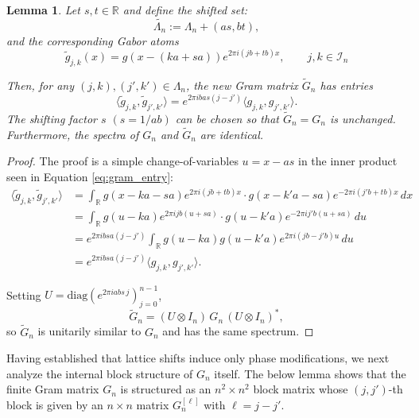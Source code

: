 \documentclass{article}
\newtheorem{lemma}[theorem]{Lemma}
\begin{document}
\begin{lemma} \label{lem:shift-invariance}
Let $s, t \in \mathbb{R}$ and define the shifted set:
\[
\widetilde{\Lambda_n} := \Lambda_n+(as, bt),
\]
and the corresponding Gabor atoms
\begin{equation}
\tilde{g}_{j,k}(x) = g(x - (ka+sa))e^{2\pi i (jb+tb) x}, \qquad j,k\in \mathcal{I}_n
\end{equation}

Then, for any $(j,k), (j',k') \in \Lambda_n$, the new Gram matrix $\tilde{G}_n$ has entries
\[
\langle \tilde{g}_{j,k}, \tilde{g}_{j',k'}\rangle = e^{2\pi i b as (j - j')} \langle g_{j,k}, g_{j',k'} \rangle.
\]
The shifting factor $s$ $(s=1/ab)$ can be chosen so that $\tilde{G}_n=G_n$ is unchanged. Furthermore, the spectra of $G_n$ and $\tilde{G}_n$ are identical.
\end{lemma}

\begin{proof}
The proof is a simple change-of-variables $u=x-as$ in the inner product seen in Equation \ref{eq:gram_entry}:
\begin{align*}
\langle \tilde{g}_{j,k}, \tilde{g}_{j',k'} \rangle
&= \int_{\mathbb{R}} g(x - ka - sa) e^{2\pi i (jb + tb)x} \cdot g(x - {k'}a - sa) e^{-2\pi i ({j'}b + tb)x} \, dx \\
&= \int_{\mathbb{R}} g(u - ka) e^{2\pi i jb (u + sa)} \cdot g(u - {k'}a) e^{-2\pi i {j'}b (u + sa)} \, du \\
&= e^{2\pi i b s a(j-j')} \int_{\mathbb{R}} g(u - ka) g(u - {k'}a) e^{2\pi i (jb - {j'}b) u} \, du \\
&= e^{2\pi i b s a(j-j')} \langle g_{j,k}, g_{j',k'} \rangle.
\end{align*}

Setting $U=\mathrm{diag}(e^{2\pi i a b s\, j})_{j=0}^{n-1}$,
\[
\tilde G_n=(U\otimes I_n)\,G_n\,(U\otimes I_n)^*,
\]
so $\tilde G_n$ is unitarily similar to $G_n$ and has the same spectrum.


\end{proof}


Having established that lattice shifts induce only phase modifications, we next analyze the internal block structure of $G_n$ itself. The below lemma shows that the finite Gram matrix $G_n$ is structured as an $n^2\times n^2$ block matrix whose $(j, j')$-th block is given by an $n\times n$ matrix $G_n^{[\ell]}$ with $\ell = j - j'$.
\end{document}

